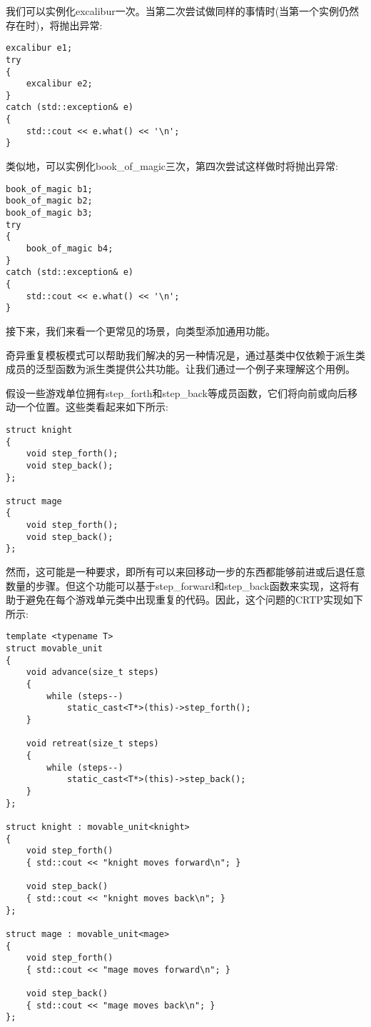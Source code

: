 我们可以实例化excalibur一次。当第二次尝试做同样的事情时(当第一个实例仍然存在时)，将抛出异常:

\begin{lstlisting}[style=styleCXX]
excalibur e1;
try
{
	excalibur e2;
}
catch (std::exception& e)
{
	std::cout << e.what() << '\n';
}
\end{lstlisting}

类似地，可以实例化book\_of\_magic三次，第四次尝试这样做时将抛出异常:

\begin{lstlisting}[style=styleCXX]
book_of_magic b1;
book_of_magic b2;
book_of_magic b3;
try
{
	book_of_magic b4;
}
catch (std::exception& e)
{
	std::cout << e.what() << '\n';
}
\end{lstlisting}

接下来，我们来看一个更常见的场景，向类型添加通用功能。


奇异重复模板模式可以帮助我们解决的另一种情况是，通过基类中仅依赖于派生类成员的泛型函数为派生类提供公共功能。让我们通过一个例子来理解这个用例。

假设一些游戏单位拥有step\_forth和step\_back等成员函数，它们将向前或向后移动一个位置。这些类看起来如下所示:

\begin{lstlisting}[style=styleCXX]
struct knight
{
	void step_forth();
	void step_back();
};

struct mage
{
	void step_forth();
	void step_back();
};
\end{lstlisting}

然而，这可能是一种要求，即所有可以来回移动一步的东西都能够前进或后退任意数量的步骤。但这个功能可以基于step\_forward和step\_back函数来实现，这将有助于避免在每个游戏单元类中出现重复的代码。因此，这个问题的CRTP实现如下所示:

\begin{lstlisting}[style=styleCXX]
template <typename T>
struct movable_unit
{
	void advance(size_t steps)
	{
		while (steps--)
			static_cast<T*>(this)->step_forth();
	}

	void retreat(size_t steps)
	{
		while (steps--)
			static_cast<T*>(this)->step_back();
	}
};

struct knight : movable_unit<knight>
{
	void step_forth()
	{ std::cout << "knight moves forward\n"; }
	
	void step_back()
	{ std::cout << "knight moves back\n"; }
};

struct mage : movable_unit<mage>
{
	void step_forth()
	{ std::cout << "mage moves forward\n"; }
	
	void step_back()
	{ std::cout << "mage moves back\n"; }
};
\end{lstlisting}

